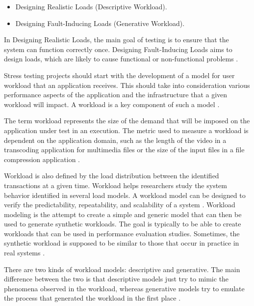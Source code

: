 \documentclass{report}
\begin{document}
\begin{itemize}
\item Designing Realistic Loads (Descriptive Workload).
\item Designing Fault-Inducing Loads (Generative Workload).
\end{itemize}

In Designing Realistic Loads, the main goal of testing is to ensure that the system can function correctly once. Designing Fault-Inducing Loads  aims to design loads, which are likely to cause functional or non-functional problems \cite{Afzal2009a}.

Stress testing projects should start with the development of a model for user workload that an application receives. This should take into consideration various performance aspects of the application and the infrastructure that a given workload will impact. A workload is a key component of such a model \cite{Molyneaux2009}.

The term workload represents the size of the demand that will be imposed on the application under test in an execution. The metric  used to measure a workload is dependent on the application domain, such as the length of the video in a transcoding application for multimedia files or the size of the input files in a file compression application \cite{Feitelson2013} \cite{Molyneaux2009} \cite{Goncalves2014}.

Workload is also defined by the load distribution between the identified transactions at a given time. Workload helps researchers study the system behavior identified in several load models. A workload model can be designed to verify the predictability, repeatability, and scalability of a system \cite{Feitelson2013} \cite{Molyneaux2009}. Workload modeling is the attempt to create a simple and generic model that can then be used to generate synthetic workloads. The goal is typically to be able to create workloads that can be used in performance evaluation studies. Sometimes, the synthetic workload is supposed to be similar to those that occur in practice in real systems \cite{Feitelson2013} \cite{Molyneaux2009}.

There are two kinds of workload models: descriptive and generative. The main difference between the two is that descriptive models just try to mimic the phenomena observed in the workload, whereas generative models try to emulate the process that generated the workload in the first place \cite{Feitelson2013}.
\end{document}
